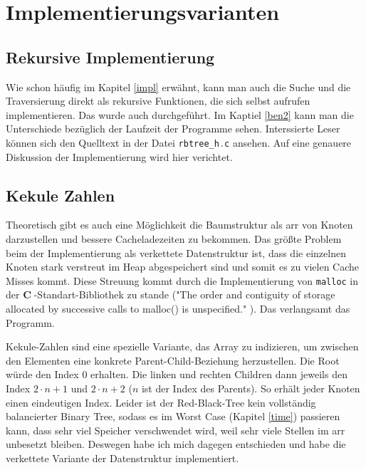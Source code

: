 \documentclass[11pt]{article}
\newcommand{\lstin}[1]{\lstinline[language=C]{#1}}
\newcommand{\cpl}{\textbf{C}$\;$}
\begin{document}
\section{Implementierungsvarianten}

\subsection{Rekursive Implementierung} 
Wie schon häufig im Kapitel \ref{impl} erwähnt, kann man auch die Suche und die Traversierung direkt als rekursive Funktionen, die sich selbst aufrufen implementieren. Das wurde auch durchgeführt. Im Kaptiel \ref{ben2} kann man die Unterschiede bezüglich der Laufzeit der Programme sehen.
Interssierte Leser können sich den Quelltext in der Datei \lstin{rbtree_h.c} ansehen. Auf eine genauere Diskussion der Implementierung wird hier verichtet.

\subsection{Kekule Zahlen}
Theoretisch gibt es auch eine Möglichkeit die Baumstruktur als \gls{arr} von Knoten darzustellen und bessere Cacheladezeiten zu bekommen.
Das größte Problem beim der Implementierung als verkettete Datenstruktur ist, dass die einzelnen Knoten stark verstreut im Heap abgespeichert sind und somit es zu vielen Cache Misses kommt. Diese Streuung kommt durch die Implementierung von \lstin{malloc} in der \cpl-Standart-Bibliothek zu stande ("The order and contiguity of storage allocated by successive calls to malloc() is unspecified." \cite{IEEEmalloc}). Das verlangsamt das Programm.

Kekule-Zahlen sind eine spezielle Variante, das Array zu indizieren, um zwischen den Elementen eine konkrete Parent-Child-Beziehung herzustellen. 
Die Root würde den Index 0 erhalten. Die linken und rechten Children dann jeweils den Index $2 \cdot n + 1$ und $2 \cdot n + 2$ ($n$ ist der Index des Parents). So erhält jeder Knoten einen eindeutigen Index.
Leider ist der Red-Black-Tree kein vollständig balancierter Binary Tree, sodass es im Worst Case (Kapitel \ref{time}) passieren kann, dass sehr viel Speicher verschwendet wird, weil sehr viele Stellen im \gls{arr} unbesetzt bleiben. Deswegen habe ich mich dagegen entschieden und habe die verkettete Variante der Datenstruktur implementiert.
\end{document}
